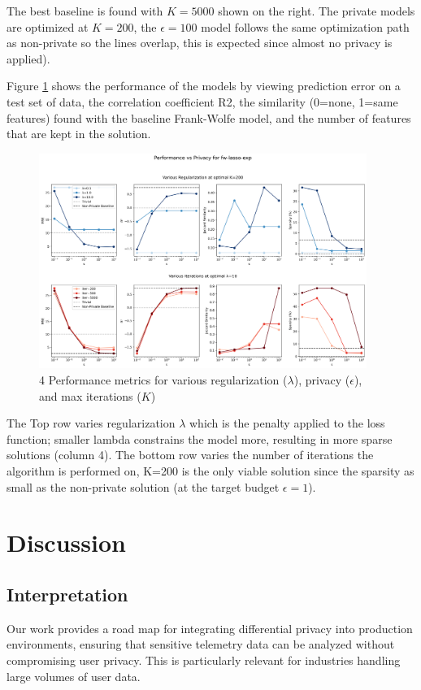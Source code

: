 \documentclass[12pt,letterpaper]{article}
\begin{document}
The best baseline is found with $K=5000$ shown on the right. The private models are optimized at $K=200$, the $\epsilon=100$ model follows the same optimization path as non-private so the lines overlap, this is expected since almost no privacy is applied).

Figure \ref{fig:lasso_results} shows the performance of the models by viewing prediction error on a test set of data, the correlation coefficient R2, the similarity (0=none, 1=same features) found with the baseline Frank-Wolfe model, and the number of features that are kept in the solution.

\begin{figure}[H]
    \centering
    \includegraphics[width=0.95\textwidth]{figure/lasso_results.png}
    \caption{4 Performance metrics for various regularization ($\lambda$), privacy ($\epsilon$), and max iterations ($K$)}
    \label{fig:lasso_results}
\end{figure}

The Top row varies regularization $\lambda$ which is the penalty applied to the loss function; smaller lambda constrains the model more, resulting in more sparse solutions (column 4). The bottom row varies the number of iterations the algorithm is performed on, K=200 is the only viable solution since the sparsity as small as the non-private solution (at the target budget $\epsilon=1$).



\section{Discussion}


\subsection{Interpretation}
Our work provides a road map for integrating differential privacy into production environments, ensuring that sensitive telemetry data can be analyzed without compromising user privacy. This is particularly relevant for industries handling large volumes of user data. 
\end{document}
